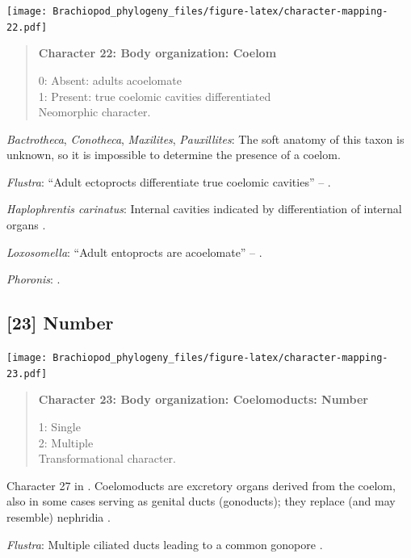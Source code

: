 \documentclass[openany]{book}
\begin{document}
\texttt{[image: Brachiopod\_phylogeny\_files/figure-latex/character-mapping-22.pdf]}

\begin{quote}
\textbf{Character 22: Body organization: Coelom}

0: Absent: adults acoelomate\\
1: Present: true coelomic cavities differentiated\\
Neomorphic character.
\end{quote}

\hypertarget{Bactrotheca-coding-22}{}
\emph{Bactrotheca}, \emph{Conotheca}, \emph{Maxilites},
\emph{Pauxillites}: The soft anatomy of this taxon is unknown, so it is
impossible to determine the presence of a coelom.

\hypertarget{Flustra-coding-22}{}
\emph{Flustra}: ``Adult ectoprocts differentiate true coelomic
cavities'' -- \citet{Fuchs2008}.

\hypertarget{Haplophrentis_carinatus-coding-22}{}
\emph{Haplophrentis carinatus}: Internal cavities indicated by
differentiation of internal organs
\citep[see][]{Moysiuk2017Hyolithsare}.

\hypertarget{Loxosomella-coding-22}{}
\emph{Loxosomella}: ``Adult entoprocts are acoelomate'' --
\citet{Fuchs2008}.

\hypertarget{Phoronis-coding-22}{}
\emph{Phoronis}: \citet{Temereva2017Innervationof}.

\subsection*{{[}23{]} Number}\label{number-1}

\texttt{[image: Brachiopod\_phylogeny\_files/figure-latex/character-mapping-23.pdf]}

\begin{quote}
\textbf{Character 23: Body organization: Coelomoducts: Number}

1: Single\\
2: Multiple\\
Transformational character.
\end{quote}

Character 27 in \citet{Haszprunar2000}. Coelomoducts are excretory
organs derived from the coelom, also in some cases serving as genital
ducts (gonoducts); they replace (and may resemble) nephridia
\citep{Goodrich1945}.

\hypertarget{Flustra-coding-23}{}
\emph{Flustra}: Multiple ciliated ducts leading to a common gonopore
\citep{Goodrich1945}.
\end{document}

